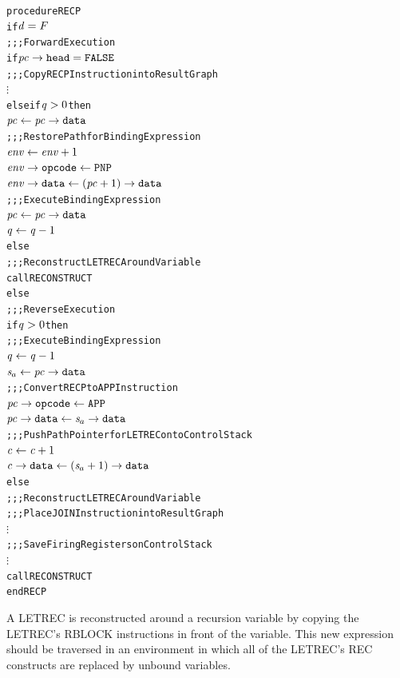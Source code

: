 \par\smallskip\noindent\begin{minipage}{\linewidth}
\begin{alltt}
procedure RECP
  if \(\rt{d} = F\)
    \textrm{;;; Forward Execution}
    if \(\rtfield{pc}{head} = \mathtt{FALSE}\)
      \textrm{;;; Copy RECP Instruction into Result Graph}
      \(\vdots\)
    else if \(\rt{q} > 0\) then
      \(\rt{pc} \leftarrow \rtfield{pc}{data}\)
      \textrm{;;; Restore Path for Binding Expression}
      \(\rt{env} \leftarrow \rt{env}+1\)
      \(\rtfield{env}{opcode} \leftarrow \mathtt{PNP}\)
      \(\rtfield{env}{data} \leftarrow (\rt{pc}+1)\rightarrow\mathtt{data}\)
      \textrm{;;; Execute Binding Expression}
      \(\rt{pc} \leftarrow \rtfield{pc}{data}\)
      \(\rt{q} \leftarrow \rt{q}-1\)
    else
      \textrm{;;; Reconstruct LETREC Around Variable}
      call RECONSTRUCT
  else
    \textrm{;;; Reverse Execution}
    if \(\rt{q} > 0\) then
      \textrm{;;; Execute Binding Expression}
      \(\rt{q} \leftarrow \rt{q}-1\)
      \(\rtsa \leftarrow \rtfield{pc}{data}\)
      \textrm{;;; Convert RECP to APP Instruction}
      \(\rtfield{pc}{opcode} \leftarrow \mathtt{APP}\)
      \(\rtfield{pc}{data} \leftarrow \rtsa\rightarrow\mathtt{data}\)
      \textrm{;;; Push Path Pointer for LETREC onto Control Stack}
      \(\rt{c} \leftarrow \rt{c}+1\)
      \(\rtfield{c}{data} \leftarrow (\rtsa+1)\rightarrow\mathtt{data}\)
    else
      \textrm{;;; Reconstruct LETREC Around Variable}
      \textrm{;;; Place JOIN Instruction into Result Graph}
      \(\vdots\)
      \textrm{;;; Save Firing Registers on Control Stack}
      \(\vdots\)
      call RECONSTRUCT
end RECP
\end{alltt}
\end{minipage}\par\smallskip


A LETREC is reconstructed around a recursion variable by copying the LETREC's RBLOCK
instructions in front of the variable. This new expression should be traversed in an
environment in which all of the LETREC's REC constructs are replaced by unbound variables.


